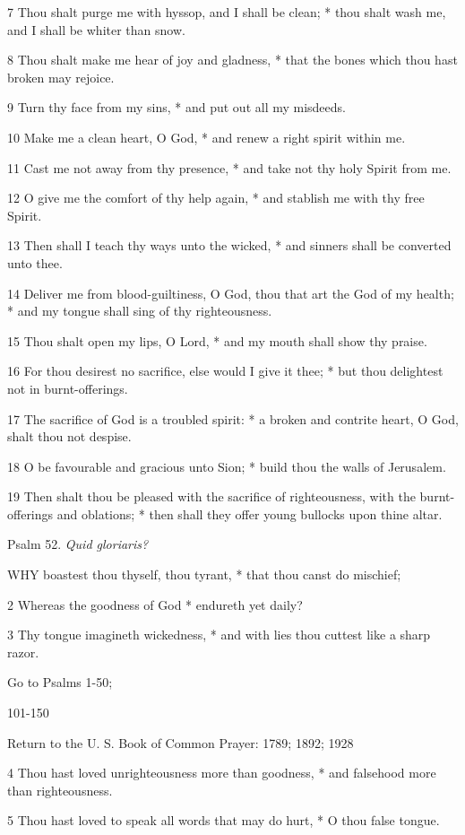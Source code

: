 7 Thou shalt purge me with hyssop, and I shall
be clean; * thou shalt wash me, and I shall be whiter than snow.

8 Thou shalt make me hear of joy and gladness, * that
the bones which thou hast broken may rejoice.

9 Turn thy face from my sins, * and put out all my
misdeeds.

10 Make me a clean heart, O God, * and renew a right
spirit within me.

11 Cast me not away from thy presence, * and take not
thy holy Spirit from me.

12 O give me the comfort of thy help again, * and stablish
me with thy free Spirit.

13 Then shall I teach thy ways unto the wicked, * and
sinners shall be converted unto thee.

14 Deliver me from blood-guiltiness, O God, thou that
art the God of my health; * and my tongue shall sing of thy righteousness.

15 Thou shalt open my lips, O Lord, * and my mouth
shall show thy praise.

16 For thou desirest no sacrifice, else would I give
it thee; * but thou delightest not in burnt-offerings.

17 The sacrifice of God is a troubled spirit: * a broken
and contrite heart, O God, shalt thou not despise.

18 O be favourable and gracious unto Sion; * build
thou the walls of Jerusalem.

19 Then shalt thou be pleased with the sacrifice of
righteousness, with the burnt-offerings and oblations; * then shall they
offer young bullocks upon thine altar.

Psalm 52. \emph{Quid gloriaris?}

WHY boastest thou thyself, thou tyrant,
* that thou canst do mischief;

2 Whereas the goodness of God * endureth yet daily?

3 Thy tongue imagineth wickedness, * and with lies
thou cuttest like a sharp razor.

Go
to Psalms 1-50; 

101-150

Return to the U. S. Book of Common Prayer: 1789;
1892; 1928

4 Thou hast loved unrighteousness more than goodness, * and falsehood more
than righteousness.

5 Thou hast loved to speak all words that may do hurt,
* O thou false tongue.

